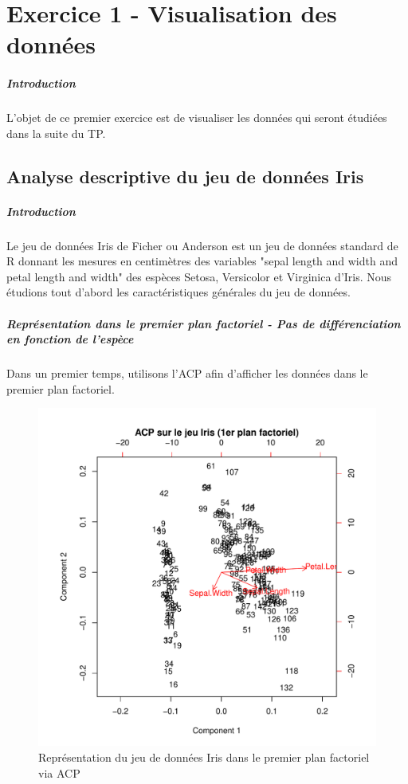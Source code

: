 \documentclass{report}
\begin{document}
\newpage
\chapter{Exercice 1 - Visualisation des données}
\paragraph{Introduction}
L'objet de ce premier exercice est de visualiser les données qui seront étudiées dans la suite du TP.
\section{Analyse descriptive du jeu de données Iris}
\paragraph{Introduction}
Le jeu de données Iris de Ficher ou Anderson est un jeu de données standard de R donnant les mesures en centimètres des variables "sepal length and width and petal length and width" des espèces Setosa, Versicolor et Virginica d'Iris. Nous étudions tout d'abord les caractéristiques générales du jeu de données.
\paragraph{Représentation dans le premier plan factoriel - Pas de différenciation en fonction de l'espèce}
Dans un premier temps, utilisons l'ACP afin d'afficher les données dans le premier plan factoriel.
\begin{figure}[ht!]
\begin{center}
    \includegraphics[width=\textwidth]{../plots/E1Q1ACPiris.pdf}
    \caption{Représentation du jeu de données Iris dans le premier plan factoriel via ACP}
\end{center}
\end{figure}
\newpage
\end{document}

